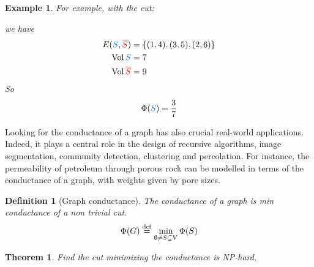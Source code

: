 \documentclass[12pt]{article}
\newtheorem{theorem}[lemma]{Theorem}
\newtheorem{definition}[lemma]{Definition}
\newtheorem{example}[lemma]{Example}
\newcommand{\defeq}{\stackrel{{\rm def}}{=}}
\newcommand{\set}[1]{\left\{ #1 \right\}}
\newcommand{\NP}{\textsc{NP}}
\DeclareMathOperator{\vol}{Vol}
\begin{document}
\begin{example}
    For example, with the cut:
    \begin{figure}[!ht]
        \centering
    \end{figure}
    \FloatBarrier
    \noindent    
    we have
    \[
        \begin{aligned}
            E(\textcolor{cyan!50!blue}{S},\textcolor{red}{\overline{S}}) &= \set{(1,4),(3,5), (2,6)}\\
            \vol \textcolor{cyan!50!blue}{S} &= 7\\
            \vol \textcolor{red}{\overline{S}} &= 9
        \end{aligned}
    \]
    So
    \[
        \Phi(\textcolor{cyan!50!blue}{S}) = \frac{3}{7}
    \]
\end{example}

Looking for the conductance of a graph has also crucial real-world applications. Indeed, it plays a central role in the design of recursive algorithms, image segmentation, community detection, clustering and percolation. For instance, the permeability of petroleum through porous rock can be modelled in terms of the conductance of a graph, with weights given by pore sizes.

\begin{definition}[Graph conductance]
    The conductance of a graph is min conductance of a non trivial cut.
    \[
        \Phi(G) \defeq \min\limits_{\emptyset \neq S \subsetneq V} \Phi(S)
    \]
\end{definition}

\begin{theorem}
    Find the cut minimizing the conductance is \NP-hard.
\end{theorem}
\end{document}
